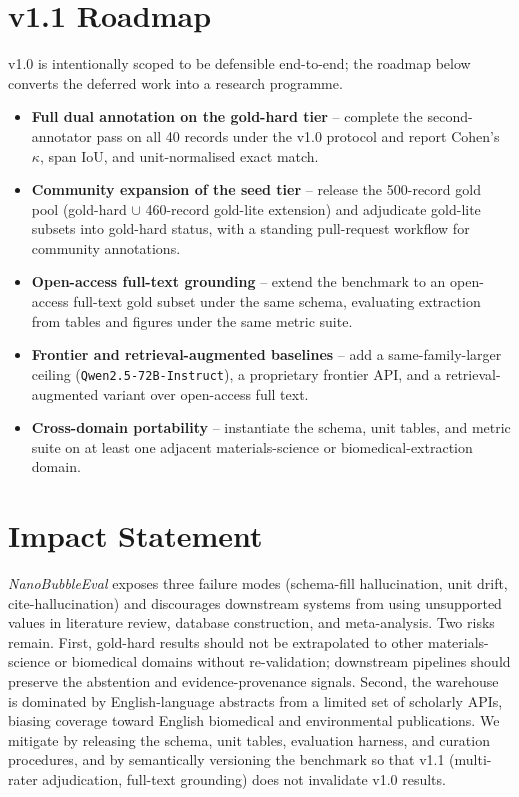\documentclass{article}
\begin{document}
\section{v1.1 Roadmap}
\label{sec:roadmap}

v1.0 is intentionally scoped to be defensible end-to-end; the roadmap below converts the deferred work into a research programme.
\begin{itemize}\itemsep0pt
\item \textbf{Full dual annotation on the gold-hard tier} -- complete the second-annotator pass on all 40 records under the v1.0 protocol and report Cohen's $\kappa$, span IoU, and unit-normalised exact match.
\item \textbf{Community expansion of the seed tier} -- release the 500-record gold pool (gold-hard $\cup$ 460-record gold-lite extension) and adjudicate gold-lite subsets into gold-hard status, with a standing pull-request workflow for community annotations.
\item \textbf{Open-access full-text grounding} -- extend the benchmark to an open-access full-text gold subset under the same schema, evaluating extraction from tables and figures under the same metric suite.
\item \textbf{Frontier and retrieval-augmented baselines} -- add a same-family-larger ceiling (\texttt{Qwen2.5-72B-Instruct}), a proprietary frontier API, and a retrieval-augmented variant over open-access full text.
\item \textbf{Cross-domain portability} -- instantiate the schema, unit tables, and metric suite on at least one adjacent materials-science or biomedical-extraction domain.
\end{itemize}

\section*{Impact Statement}
\label{sec:impact}

\textit{NanoBubbleEval} exposes three failure modes (schema-fill hallucination, unit drift, cite-hallucination) and discourages downstream systems from using unsupported values in literature review, database construction, and meta-analysis. Two risks remain. First, gold-hard results should not be extrapolated to other materials-science or biomedical domains without re-validation; downstream pipelines should preserve the abstention and evidence-provenance signals. Second, the warehouse is dominated by English-language abstracts from a limited set of scholarly APIs, biasing coverage toward English biomedical and environmental publications. We mitigate by releasing the schema, unit tables, evaluation harness, and curation procedures, and by semantically versioning the benchmark so that v1.1 (multi-rater adjudication, full-text grounding) does not invalidate v1.0 results.
\end{document}
